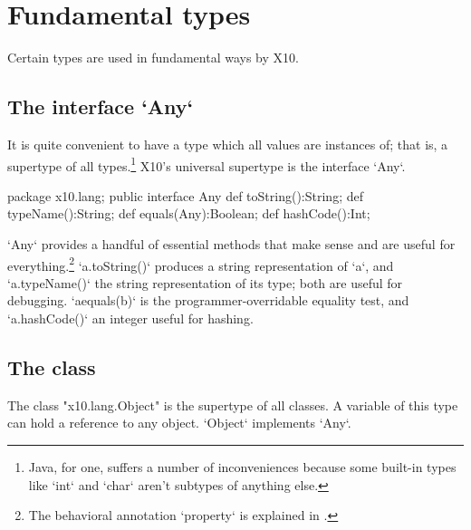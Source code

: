 {\begin{itemize}
\end{itemize}


\section{Fundamental types}

Certain types are used in fundamental ways by X10.  

\subsection{The interface \xcd`Any`}

It is quite convenient to have a type which all values are instances of; that
is, a supertype of all types.\footnote{Java, for one, suffers a number of
  inconveniences because some built-in types like \xcd`int` and \xcd`char`
  aren't subtypes of anything else.}  X10's universal supertype is the
  interface \xcd`Any`. 

\begin{xten}
package x10.lang;
public interface Any {
  def toString():String;
  def typeName():String;
  def equals(Any):Boolean;
  def hashCode():Int;
}
\end{xten}

\xcd`Any` provides a handful of essential methods that make sense and are
useful for everything.\footnote{The behavioral annotation \xcd`property` is
  explained in .} \xcd`a.toString()` produces a
string representation of \xcd`a`, and \xcd`a.typeName()` the string
representation of its type; both are useful for debugging.  \xcd`aequals(b)`
is the programmer-overridable equality test, and \xcd`a.hashCode()` an integer
useful for hashing.  


\subsection{The class }
\label{Object}

The class \xcd"x10.lang.Object" is the supertype of all classes.
A variable of this type can hold a reference to any object.
\xcd`Object` implements \xcd`Any`.



}
